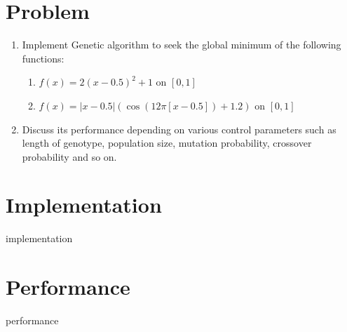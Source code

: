 \documentclass[12pt,letterpaper]{article}
\begin{document}
\section*{Problem}

\begin{enumerate}
  \item Implement Genetic algorithm to seek the global minimum of the following functions:
  \begin{enumerate}
    \item $f(x) = 2(x-0.5)^2 + 1$ on $[0, 1]$
    \item $f(x) = |x-0.5|(\cos(12\pi[x-0.5]) + 1.2)$ on $[0, 1]$
  \end{enumerate}
  \item Discuss its performance depending on various control parameters such as length of genotype, population size, mutation probability, crossover probability and so on.
\end{enumerate}

\section*{Implementation}
{implementation}

\newpage
\section*{Performance}
{performance}
\end{document}

